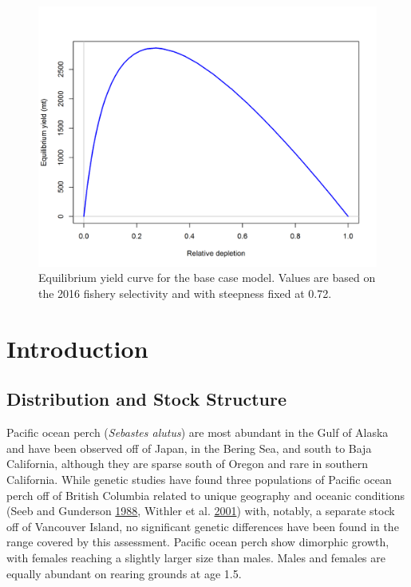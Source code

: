 \documentclass[12pt,]{article}
\begin{document}
\FloatBarrier

\begin{figure}
\centering
\includegraphics{r4ss/plots_mod1/yield1_yield_curve.png}
\caption{Equilibrium yield curve for the base case model. Values are
based on the 2016 fishery selectivity and with steepness fixed at 0.72.
\label{fig:Yield_all}}
\end{figure}

\FloatBarrier

\newpage

\renewcommand{\thefigure}{\arabic{figure}}
\renewcommand{\thetable}{\arabic{table}}

\setcounter{figure}{0} \setcounter{table}{0}


\section{Introduction}\label{introduction}

\subsection{Distribution and Stock
Structure}\label{distribution-and-stock-structure}

Pacific ocean perch (\emph{Sebastes alutus}) are most abundant in the
Gulf of Alaska and have been observed off of Japan, in the Bering Sea,
and south to Baja California, although they are sparse south of Oregon
and rare in southern California. While genetic studies have found three
populations of Pacific ocean perch off of British Columbia related to
unique geography and oceanic conditions (Seeb and Gunderson
\protect\hyperlink{ref-seeb_genetic_1988}{1988}, Withler et al.
\protect\hyperlink{ref-withler_co-existing_2001}{2001}) with, notably, a
separate stock off of Vancouver Island, no significant genetic
differences have been found in the range covered by this assessment.
Pacific ocean perch show dimorphic growth, with females reaching a
slightly larger size than males. Males and females are equally abundant
on rearing grounds at age 1.5.
\end{document}
